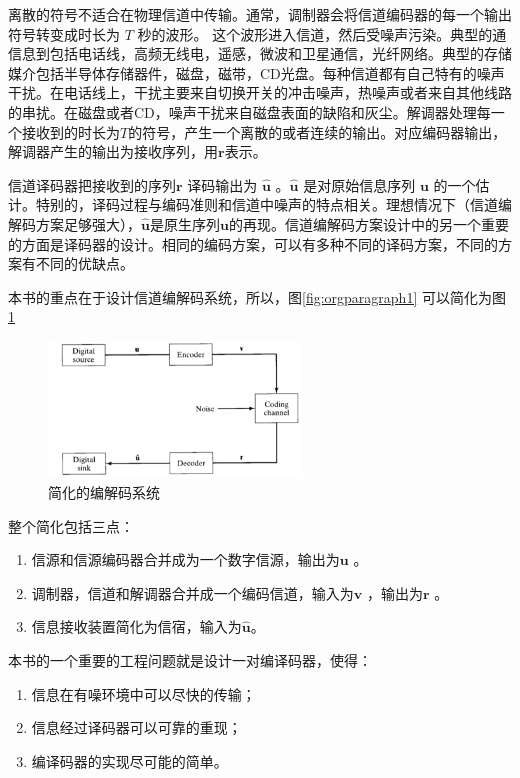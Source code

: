 \documentclass[10pt,a4paper,UTF8]{article}
\begin{document}
离散的符号不适合在物理信道中传输。通常，调制器会将信道编码器的每一个输出符号转变成时长为 \(T\) 秒的波形。 这个波形进入信道，然后受噪声污染。典型的通信息到包括电话线，高频无线电，遥感，微波和卫星通信，光纤网络。典型的存储媒介包括半导体存储器件，磁盘，磁带，CD光盘。每种信道都有自己特有的噪声干扰。在电话线上，干扰主要来自切换开关的冲击噪声，热噪声或者来自其他线路的串扰。在磁盘或者CD，噪声干扰来自磁盘表面的缺陷和灰尘。解调器处理每一个接收到的时长为\(T\)的符号，产生一个离散的或者连续的输出。对应编码器输出，解调器产生的输出为接收序列，用\(\mathbf{r}\)表示。

信道译码器把接收到的序列\(\mathbf{r}\) 译码输出为 \(\hat{\mathbf{u}}\) 。\(\hat{\mathbf{u}}\) 是对原始信息序列 \(\mathbf{u}\) 的一个估计。特别的，译码过程与编码准则和信道中噪声的特点相关。理想情况下（信道编解码方案足够强大），\(\hat{\mathbf{u}}\)是原生序列\(\mathbf{u}\)的再现。信道编解码方案设计中的另一个重要的方面是译码器的设计。相同的编码方案，可以有多种不同的译码方案，不同的方案有不同的优缺点。

本书的重点在于设计信道编解码系统，所以，图\ref{fig:orgparagraph1} 可以简化为图\ref{fig:orgparagraph2}
\begin{figure}[htb]
\centering
\includegraphics[width=0.6\textwidth]{../../img/20161112figure01_02.png}
\caption{\label{fig:orgparagraph2}
简化的编解码系统}
\end{figure} 

整个简化包括三点：
\begin{enumerate}
\item 信源和信源编码器合并成为一个数字信源，输出为\(\mathbf{u}\) 。
\item 调制器，信道和解调器合并成一个编码信道，输入为\(\mathbf{v}\) ，输出为\(\mathbf{r}\) 。
\item 信息接收装置简化为信宿，输入为\(\hat{\mathbf{u}}\)。
\end{enumerate}

本书的一个重要的工程问题就是设计一对编译码器，使得：
\begin{enumerate}
\item 信息在有噪环境中可以尽快的传输；
\item 信息经过译码器可以可靠的重现；
\item 编译码器的实现尽可能的简单。
\end{enumerate}
\end{document}
